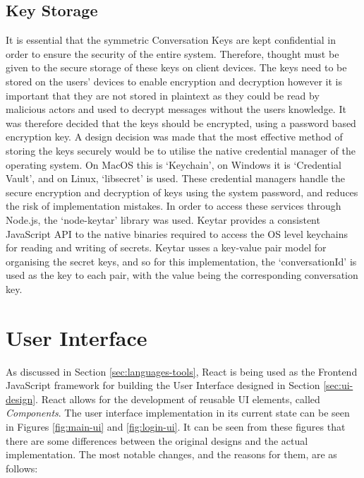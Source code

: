 \subsection{Key Storage}
It is essential that the symmetric Conversation Keys are kept confidential in order to ensure the security of the entire system. Therefore, thought must be given to the secure storage of these keys on client devices. The keys need to be stored on the users' devices to enable encryption and decryption however it is important that they are not stored in plaintext as they could be read by malicious actors and used to decrypt messages without the users knowledge. It was therefore decided that the keys should be encrypted, using a password based encryption key. A design decision was made that the most effective method of storing the keys securely would be to utilise the native credential manager of the operating system. On MacOS this is `Keychain', on Windows it is `Credential Vault', and on Linux, `libsecret' is used. These credential managers handle the secure encryption and decryption of keys using the system password, and reduces the risk of implementation mistakes. In order to access these services through Node.js, the `node-keytar' library was used. Keytar provides a consistent JavaScript API to the native binaries required to access the OS level keychains for reading and writing of secrets. Keytar usses a key-value pair model for organising the secret keys, and so for this implementation, the `conversationId' is used as the key to each pair, with the value being the corresponding conversation key.

\section{User Interface}
As discussed in Section \ref{sec:languages-tools}, React is being used as the Frontend JavaScript framework for building the User Interface designed in Section \ref{sec:ui-design}. React allows for the development of reusable UI elements, called \textit{Components}. The user interface implementation in its current state can be seen in Figures \ref{fig:main-ui} and \ref{fig:login-ui}. It can be seen from these figures that there are some differences between the original designs and the actual implementation. The most notable changes, and the reasons for them, are as follows:

